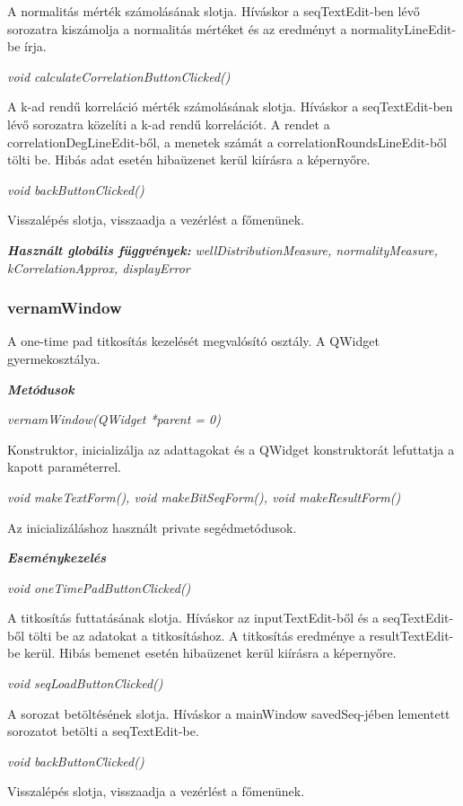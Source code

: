 \documentclass[hidelinks, 12pt]{article}
\begin{document}
A normalitás mérték számolásának slotja. Híváskor a seqTextEdit-ben lévő sorozatra kiszámolja a normalitás mértéket és az eredményt a normalityLineEdit-be írja.

\textit{void calculateCorrelationButtonClicked()}

A k-ad rendű korreláció mérték számolásának slotja. Híváskor a seqTextEdit-ben lévő sorozatra közelíti a k-ad rendű korrelációt. A rendet a correlationDegLineEdit-ből, a menetek számát a correlationRoundsLineEdit-ből tölti be. Hibás adat esetén hibaüzenet kerül kiírásra a képernyőre.

\textit{void backButtonClicked()}

Visszalépés slotja, visszaadja a vezérlést a főmenünek.

\textit{\textbf{Használt globális függvények: }}\textit{wellDistributionMeasure, normalityMeasure, kCorrelationApprox, displayError}

\subsubsection*{vernamWindow}

A one-time pad titkosítás kezelését megvalósító osztály. A QWidget gyermekosztálya.

\textbf{\textit{Metódusok}}

\textit{vernamWindow(QWidget *parent = 0)}

Konstruktor, inicializálja az adattagokat és a QWidget konstruktorát lefuttatja a kapott paraméterrel.

\textit{void makeTextForm(), void makeBitSeqForm(),	void makeResultForm()}

Az inicializáláshoz használt private segédmetódusok.

\textbf{\textit{Eseménykezelés}}

\textit{void oneTimePadButtonClicked()}

A titkosítás futtatásának slotja. Híváskor az inputTextEdit-ből és a  seqTextEdit-ből tölti be az adatokat a titkosításhoz. A titkosítás eredménye a resultTextEdit-be kerül. Hibás bemenet esetén hibaüzenet kerül kiírásra a képernyőre.

\textit{void seqLoadButtonClicked()}

A sorozat betöltésének slotja. Híváskor a mainWindow savedSeq-jében lementett sorozatot betölti a seqTextEdit-be.

\textit{void backButtonClicked()}

Visszalépés slotja, visszaadja a vezérlést a főmenünek.
\end{document}
